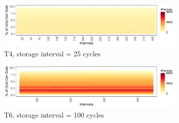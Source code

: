 \begin{figure}[!ht]
\begin{subfigure}{\linewidth}
\centering
\includegraphics[width=\linewidth]{Images/ABC_Intervals_T4.pdf}
\vspace{-5mm}
\caption{T4, storage interval = 25 cycles}
\label{fig:abc_4}
\end{subfigure}
\begin{subfigure}{\linewidth}
\centering
\includegraphics[width=\linewidth]{Images/ABC_Intervals_T6.pdf}
\vspace{-5mm}
\caption{T6, storage interval = 100 cycles}
\label{fig:abc_6}
\end{subfigure}
\caption{} 
\vspace{-5mm}
\label{fig:abc_map}
\end{figure}
